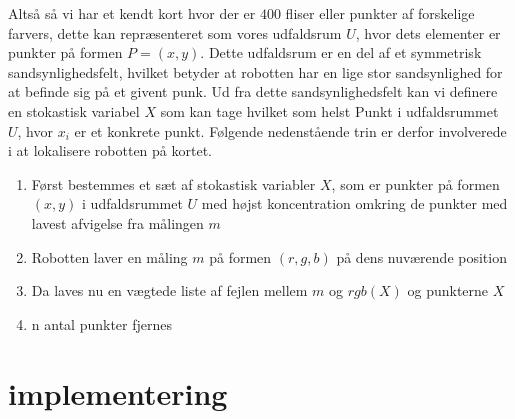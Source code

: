 \documentclass[../../SRP.tex]{subfiles}
\begin{document}

\begin{center}
\end{center}

Altså så vi har et kendt kort hvor der er $400$ fliser eller punkter af forskelige farvers, dette kan repræsenteret som vores udfaldsrum $U$, hvor dets elementer er punkter på formen $P = (x,y)$. Dette udfaldsrum er en del af et symmetrisk sandsynlighedsfelt, hvilket betyder at robotten har en lige stor sandsynlighed for at befinde sig på et givent punk. Ud fra dette sandsynlighedsfelt kan vi definere en stokastisk variabel $X$ som kan tage hvilket som helst Punkt i udfaldsrummet $U$, hvor $x_i$ er et konkrete punkt. Følgende nedenstående trin er derfor involverede i at lokalisere robotten på kortet.

\begin{enumerate}
  \item Først bestemmes et sæt af stokastisk variabler $X$, som er punkter på formen $(x,y)$ i udfaldsrummet $U$ med højst koncentration omkring de punkter med lavest afvigelse fra målingen $m$

  \item Robotten laver en måling $m$ på formen $(r,g,b)$ på dens nuværende position

  \item Da laves nu en vægtede liste af fejlen mellem $m$ og $rgb(X)$ og punkterne $X$

  \item n antal punkter fjernes
\end{enumerate}

\section{implementering}
\end{document}
